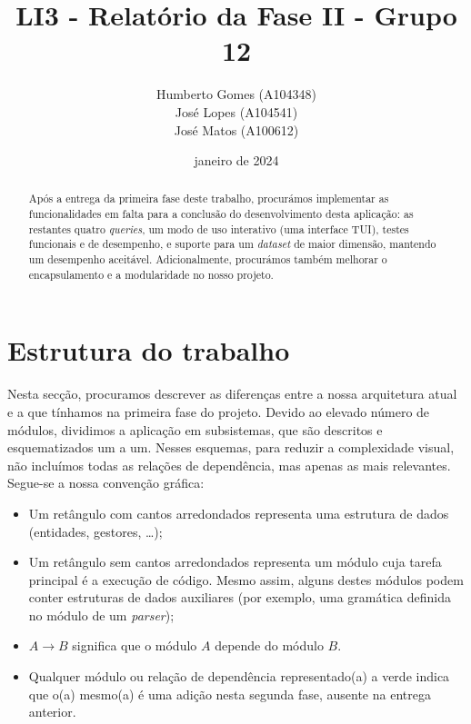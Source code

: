 \documentclass[12pt, a4paper]{article}
\title{\textbf{LI3 - Relatório da Fase II - Grupo 12}}
\author{
    Humberto Gomes (A104348) \\
    José Lopes     (A104541) \\
    José Matos     (A100612) \\
}
\date{janeiro de 2024}
\begin{document}
\maketitle
\onehalfspacing
\setlength{\parskip}{\baselineskip}
\setlength{\parindent}{0pt}

\pagebreak
\begin{abstract}
    Após a entrega da primeira fase deste trabalho, procurámos implementar as funcionalidades em
    falta para a conclusão do desenvolvimento desta aplicação: as restantes quatro \emph{queries},
    um modo de uso interativo (uma interface TUI), testes funcionais e de desempenho, e suporte
    para um \emph{dataset} de maior dimensão, mantendo um desempenho aceitável. Adicionalmente,
    procurámos também melhorar o encapsulamento e a modularidade no nosso projeto.
\end{abstract}

\section{Estrutura do trabalho}

Nesta secção, procuramos descrever as diferenças entre a nossa arquitetura atual e a que tínhamos
na primeira fase do projeto. Devido ao elevado número de módulos, dividimos a aplicação em
subsistemas, que são descritos e esquematizados um a um. Nesses esquemas, para reduzir a
complexidade visual, não incluímos todas as relações de dependência, mas apenas as mais relevantes.
Segue-se a nossa convenção gráfica:

\begin{itemize}
    \item Um retângulo com cantos arredondados representa uma estrutura de dados (entidades,
          gestores, \ldots);
    \item Um retângulo sem cantos arredondados representa um módulo cuja tarefa principal é a
          execução de código. Mesmo assim, alguns destes módulos podem conter estruturas de dados
          auxiliares (por exemplo, uma gramática definida no módulo de um \emph{parser});
    \item $A \rightarrow B$ significa que o módulo $A$ depende do módulo $B$.
    \item Qualquer módulo ou relação de dependência representado(a) a {\color{ForestGreen}verde}
          indica que o(a) mesmo(a) é uma adição nesta segunda fase, ausente na entrega anterior.
\end{itemize}
\end{document}

